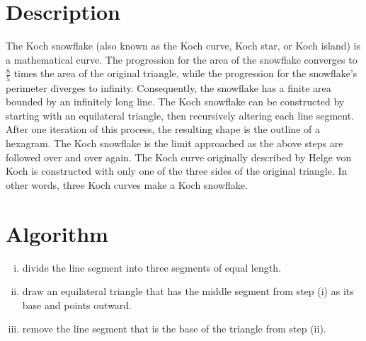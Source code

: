 \documentclass[11pt]{report}
\begin{document}
\section{Description}
The Koch snowflake (also known as the Koch curve, Koch star, or Koch island) is a mathematical curve. The progression for the area of the snowflake converges to 
$\frac{8}{5}$ times the area of the original triangle, while the progression for the snowflake's perimeter diverges to infinity. Consequently, the snowflake has a finite area bounded by an infinitely long line. The Koch snowflake can be constructed by starting with an equilateral triangle, then recursively altering each line segment. After one iteration of this process, the resulting shape is the outline of a hexagram. The Koch snowflake is the limit approached as the above steps are followed over and over again. The Koch curve originally described by Helge von Koch is constructed with only one of the three sides of the original triangle. In other words, three Koch curves make a Koch snowflake.

\section{Algorithm}

\begin{enumerate}[(i)]
	\item divide the line segment into three segments of equal length.
	\item draw an equilateral triangle that has the middle segment from step (i) as its base and points outward.
	\item remove the line segment that is the base of the triangle from step (ii).
\end{enumerate}
\end{document}
